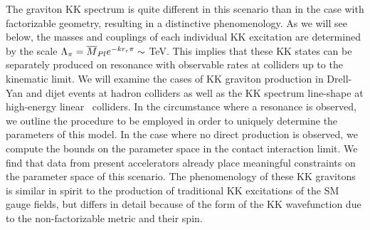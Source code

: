The graviton KK spectrum is quite different in this scenario than in the 
case with factorizable geometry, resulting in a distinctive phenomenology.
As we will see below, the masses and couplings of each individual KK excitation
are determined by the scale $\Lambda_\pi=\mpl e^{-kr_c\pi}\sim$ TeV.
This implies that these KK states can be separately produced on resonance with
observable rates at colliders up to the kinematic limit.   We will examine 
the cases of KK graviton production in Drell-Yan and dijet events at hadron
colliders as well as the KK spectrum line-shape at high-energy linear \epem\
colliders.  In the circumstance where a resonance is observed, we outline the 
procedure to be employed in order to uniquely determine the parameters of this
model.  In the case where no direct production is observed, we compute
the bounds on the parameter space in the contact interaction limit.  We find
that data from present accelerators already place meaningful constraints on
the parameter space of this scenario.
The phenomenology of these KK gravitons  is similar in spirit to the 
production of traditional KK excitations of the SM gauge fields\cite{ant}, 
but differs in detail because of the form of the KK wavefunction due to the
non-factorizable metric and their spin.

